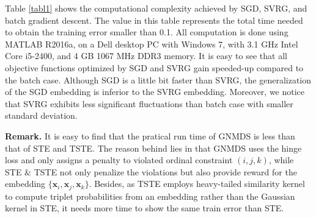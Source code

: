 \documentclass[letterpaper]{article}
\begin{document}
        Table \ref{tabl1} shows the computational complexity achieved by SGD, SVRG, and batch gradient descent. The value in this table represents the total time needed to obtain the training error smaller than 0.1. All computation is done using MATLAB R2016a, on
a Dell desktop PC with Windows 7, with 3.1 GHz Intel Core
i5-2400, and 4 GB 1067 MHz DDR3 memory. It is easy to see that all objective functions optimized by SGD and SVRG gain speeded-up compared to the batch case. Although SGD is a little bit faster than SVRG, the generalization of the SGD embedding is inferior to the SVRG embedding. Moreover, we notice that SVRG exhibits less
significant fluctuations than batch case with smaller standard deviation. 

\textbf{Remark. } It is easy to find that the pratical run time of GNMDS is less than that of STE and TSTE. The reason behind lies in that 
GNMDS uses the hinge loss and only assigns a penalty to violated ordinal constraint $(i,j,k)$, while STE $\&$ TSTE not only penalize the violations but also provide reward for the embedding $\{\mathbf{x}_i, \mathbf{x}_j, \mathbf{x}_k\}$. Besides, as TSTE employs heavy-tailed similarity kernel to compute triplet probabilities from an embedding rather than the Gaussian kernel in STE, it needs more time to show the same train error than STE.
 
\end{document}

